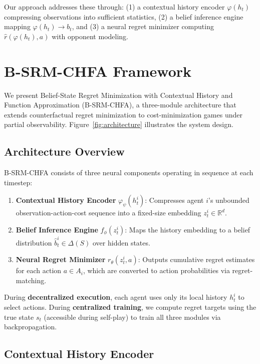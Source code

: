 \documentclass{article}
\begin{document}
Our approach addresses these through: (1) a contextual history encoder $\varphi(h_t)$ compressing observations into sufficient statistics, (2) a belief inference engine mapping $\varphi(h_t) \to b_t$, and (3) a neural regret minimizer computing $\hat{r}(\varphi(h_t), a)$ with opponent modeling.

\section{B-SRM-CHFA Framework}

We present Belief-State Regret Minimization with Contextual History and Function Approximation (B-SRM-CHFA), a three-module architecture that extends counterfactual regret minimization to cost-minimization games under partial observability. Figure~\ref{fig:architecture} illustrates the system design.

\subsection{Architecture Overview}

B-SRM-CHFA consists of three neural components operating in sequence at each timestep:

\begin{enumerate}
    \item \textbf{Contextual History Encoder} $\varphi_\psi(h_t^i)$: Compresses agent $i$'s unbounded observation-action-cost sequence into a fixed-size embedding $z_t^i \in \mathbb{R}^d$.
    
    \item \textbf{Belief Inference Engine} $f_\phi(z_t^i)$: Maps the history embedding to a belief distribution $\hat{b}_t^i \in \Delta(S)$ over hidden states.
    
    \item \textbf{Neural Regret Minimizer} $r_\theta(z_t^i, a)$: Outputs cumulative regret estimates for each action $a \in A_i$, which are converted to action probabilities via regret-matching.
\end{enumerate}

During \textbf{decentralized execution}, each agent uses only its local history $h_t^i$ to select actions. During \textbf{centralized training}, we compute regret targets using the true state $s_t$ (accessible during self-play) to train all three modules via backpropagation.

\subsection{Contextual History Encoder}
\end{document}
